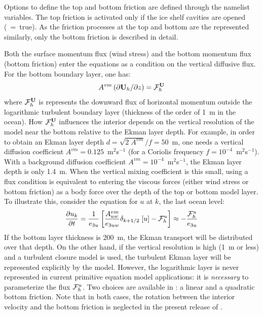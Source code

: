 Options to define the top and bottom friction are defined through the   namelist variables.
The top friction is activated only if the ice shelf cavities are opened (~=~true).
As the friction processes at the top and bottom are the represented similarly, only the bottom friction is described in detail.

Both the surface momentum flux (wind stress) and the bottom momentum 
flux (bottom friction) enter the equations as a condition on the vertical 
diffusive flux. For the bottom boundary layer, one has:
\begin{equation} \label{Eq_zdfbfr_flux}
A^{vm} \left( \partial {\textbf U}_h / \partial z \right) = {{\cal F}}_h^{\textbf U}
\end{equation}
where ${\cal F}_h^{\textbf U}$ is represents the downward flux of horizontal momentum 
outside the logarithmic turbulent boundary layer (thickness of the order of 
1~m in the ocean). How ${\cal F}_h^{\textbf U}$ influences the interior depends on the 
vertical resolution of the model near the bottom relative to the Ekman layer 
depth. For example, in order to obtain an Ekman layer depth 
$d = \sqrt{2\;A^{vm}} / f = 50$~m, one needs a vertical diffusion coefficient 
$A^{vm} = 0.125$~m$^2$s$^{-1}$ (for a Coriolis frequency 
$f = 10^{-4}$~m$^2$s$^{-1}$). With a background diffusion coefficient 
$A^{vm} = 10^{-4}$~m$^2$s$^{-1}$, the Ekman layer depth is only 1.4~m. 
When the vertical mixing coefficient is this small, using a flux condition is 
equivalent to entering the viscous forces (either wind stress or bottom friction) 
as a body force over the depth of the top or bottom model layer. To illustrate 
this, consider the equation for $u$ at $k$, the last ocean level:
\begin{equation} \label{Eq_zdfbfr_flux2}
\frac{\partial u_k}{\partial t} = \frac{1}{e_{3u}} \left[ \frac{A_{uw}^{vm}}{e_{3uw}} \delta_{k+1/2}\;[u] - {\cal F}^u_h \right] \approx - \frac{{\cal F}^u_{h}}{e_{3u}}
\end{equation}
If the bottom layer thickness is 200~m, the Ekman transport will 
be distributed over that depth. On the other hand, if the vertical resolution 
is high (1~m or less) and a turbulent closure model is used, the turbulent 
Ekman layer will be represented explicitly by the model. However, the 
logarithmic layer is never represented in current primitive equation model 
applications: it is \emph{necessary} to parameterize the flux ${\cal F}^u_h $. 
Two choices are available in \NEMO: a linear and a quadratic bottom friction. 
Note that in both cases, the rotation between the interior velocity and the 
bottom friction is neglected in the present release of \NEMO.

